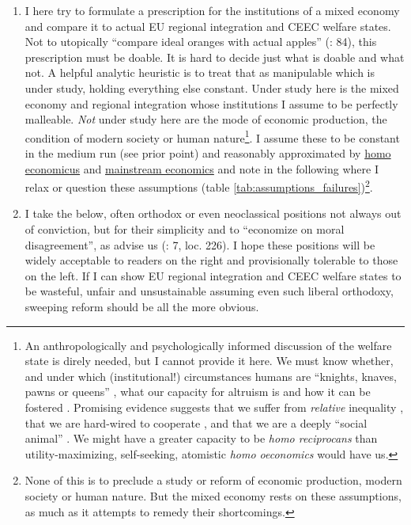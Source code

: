 \documentclass[11pt,a4paper,oneside,openright]{article}
\begin{document}
\begin{enumerate}
\begin{enumerate}
		\item I here try to formulate a prescription for the institutions of a mixed economy and compare it to actual \gls{EU} regional integration and \gls{CEEC} welfare states. Not to utopically ``compare ideal oranges with actual apples'' (\citealt{Dahl-1989-aa}: 84), this prescription must be doable. It is hard to decide just what is doable and what not. A helpful analytic heuristic is to treat that as manipulable which is under study, holding everything else constant. Under study here is the mixed economy and regional integration whose institutions I assume to be perfectly malleable. \emph{Not} under study here are the mode of economic production, the condition of modern society or human nature\footnote
			{An anthropologically and psychologically informed discussion of the welfare state is direly needed, but I cannot provide it here. We must know whether, and under which (institutional!) circumstances humans are ``knights, knaves, pawns or queens'' \citep{LeGrand2003}, what our capacity for altruism is \citep{Henrich2007} and how it can be fostered \citep{Axelrod1981a}. Promising evidence suggests that we suffer from \emph{relative} inequality \citep{Pickett-2009-kx}, that we are hard-wired to cooperate \citep{Zak2011}, and that we are a deeply ``social animal'' \citep{Brooks2011}. We might have a greater capacity to be \emph{homo reciprocans} than utility-maximizing, self-seeking, atomistic \emph{homo oeconomics} would have us.}.
		I assume these to be constant in the medium run (see prior point) and reasonably approximated by \hyperref[it:homo_economicus]{homo economicus} and \hyperref[sec:perfect_competition]{mainstream economics} and note in the following where I relax or question these assumptions (table \ref{tab:assumptions_failures})\footnote
			{None of this is to preclude a study or reform of economic production, modern society or human nature. But the mixed economy rests on these assumptions, as much as it attempts to remedy their shortcomings.}. 
		
		\item {} \label{it:economize_moral} I take the below, often orthodox or even neoclassical positions not always out of conviction, but for their simplicity and to ``economize on moral disagreement'', as \citeauthor{GutmannThompson-2004-aa} advise us (\citeyear{GutmannThompson-2004-aa}: 7,  loc. 226). I hope these positions will be widely acceptable to readers on the right and provisionally tolerable to those on the left. If I can show \gls{EU} regional integration and \gls{CEEC} welfare states to be wasteful, unfair and unsustainable assuming even such liberal orthodoxy, sweeping reform should be all the more obvious.
		
		
	\end{enumerate}
\end{enumerate}
\end{document}
